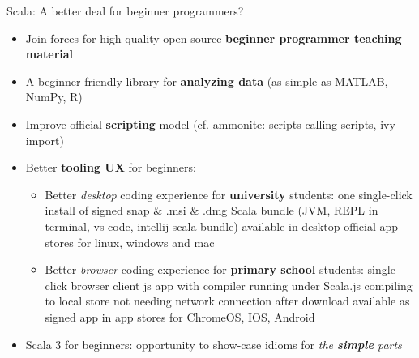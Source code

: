 \documentclass[aspectratio=169]{beamer}
\newenvironment{Slide}[1]%
  {\begin{frame}[environment=Slide]{#1}}
  {\end{frame}}%
\begin{document}
\begin{Slide}{Scala: A better deal for beginner programmers?}
  \begin{itemize}
    \item Join forces for high-quality open source \textbf{beginner programmer teaching material}
    \item A beginner-friendly library for \textbf{analyzing data} (as simple as MATLAB, NumPy, R)
    \item Improve official \textbf{scripting} model (cf. ammonite: scripts calling scripts, ivy import)
    \item Better \textbf{tooling UX} for beginners: 
    \begin{itemize}
      \item Better \textit{desktop} coding experience for \textbf{university} students: one single-click install of signed snap \& .msi \& .dmg  \textbf{\color{red}{complete}} Scala bundle (JVM, REPL in terminal, vs code, intellij scala bundle) available in desktop official app stores for linux, windows and mac
      \item Better \textit{browser} coding experience for \textbf{primary school} students: single click browser client js app with compiler running under Scala.js compiling to local store not needing network connection after download available as signed app in app stores for ChromeOS, IOS, Android
    \end{itemize}
    \item Scala 3 for beginners: opportunity to show-case idioms for \textit{the \textbf{simple} parts}
  \end{itemize}

\end{Slide}


\begin{frame}[plain]
  \begin{figure}
  \centering
  \end{figure}%


\end{frame}%
\end{document}
